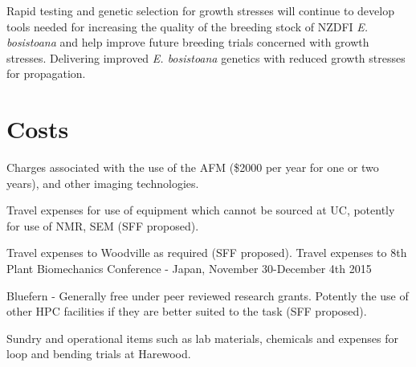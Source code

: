 \documentclass{article}
\begin{document}
Rapid testing and genetic selection for growth stresses will continue to develop
tools needed for increasing the quality of the breeding stock of NZDFI
\textit{E. bosistoana} and help improve future breeding trials concerned with
growth stresses. Delivering improved \textit{E. bosistoana} genetics with
reduced growth stresses for propagation.


\section{Costs}
Charges associated with the use of the AFM (\$2000 per year for one or two
years), and other imaging technologies.

Travel expenses for use of equipment which cannot be sourced at UC, potently for
use of NMR, SEM (SFF proposed).

Travel expenses to Woodville as required (SFF proposed).
Travel expenses to 8th Plant Biomechanics Conference - Japan, November
30-December 4th 2015

Bluefern - Generally free under peer reviewed research grants. Potently the use
of other HPC facilities if they are better suited to the task (SFF proposed).

Sundry and operational items such as lab materials, chemicals and expenses for
loop and bending trials at Harewood.
\end{document}
